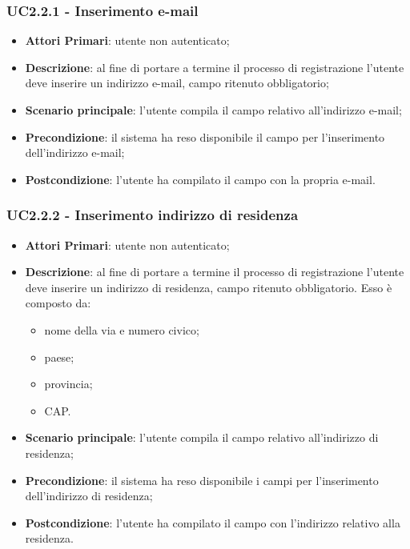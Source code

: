 \subsubsection{UC2.2.1 - Inserimento e-mail}
\begin{itemize}
	\item \textbf{Attori Primari}: utente non autenticato;
	\item \textbf{Descrizione}: al fine di portare a termine il processo di registrazione l'utente deve inserire un indirizzo e-mail, campo ritenuto obbligatorio;
	\item \textbf{Scenario principale}: l'utente compila il campo relativo all'indirizzo e-mail;
	\item \textbf{Precondizione}: il sistema ha reso disponibile il campo per l'inserimento dell'indirizzo e-mail;
	\item \textbf{Postcondizione}: l'utente ha compilato il campo con la propria e-mail.
	
\end{itemize}
\subsubsection{UC2.2.2 - Inserimento indirizzo di residenza}
\begin{itemize}
	\item \textbf{Attori Primari}: utente non autenticato;
	\item \textbf{Descrizione}: al fine di portare a termine il processo di registrazione l'utente deve inserire un indirizzo di residenza, campo ritenuto obbligatorio. Esso è composto da: 
	\begin{itemize}
	\item nome della via e numero civico;
	\item paese;
	\item provincia;
	\item CAP.

	\end{itemize}
	\item \textbf{Scenario principale}: l'utente compila il campo relativo all'indirizzo di residenza;
	\item \textbf{Precondizione}: il sistema ha reso disponibile i campi per l'inserimento dell'indirizzo di residenza;
	\item \textbf{Postcondizione}: l'utente ha compilato il campo con l'indirizzo relativo alla residenza.
\end{itemize}
